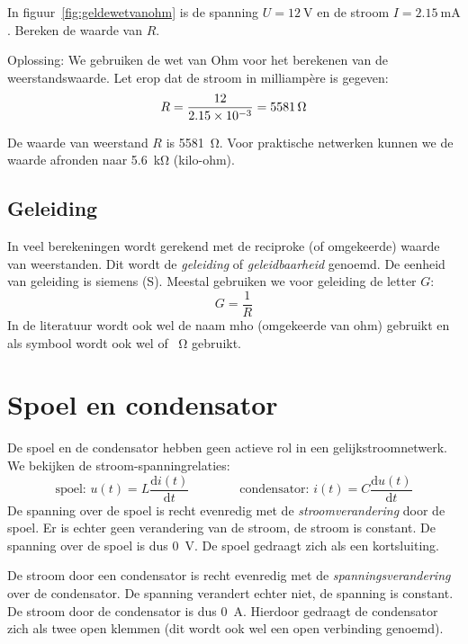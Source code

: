\begin{example}
In figuur~\ref{fig:geldewetvanohm} is de spanning $U=\SI{12}{\volt}$ en de stroom $I=\SI{2.15}{\milli\ampere}$.
Bereken de waarde van $R$.

Oplossing: We gebruiken de wet van Ohm voor het berekenen van de weerstandswaarde. Let erop dat de stroom in milliampère is gegeven:
\begin{equation}
R = \dfrac{12}{\num{2.15d-3}} = \SI{5581}{\ohm} 
\end{equation}

De waarde van weerstand $R$ is \SI{5581}{\ohm}. Voor praktische netwerken kunnen we de waarde afronden
naar \SI{5.6}{\kilo\ohm} (kilo-ohm).
\end{example}

\subsection{Geleiding}
In veel berekeningen wordt gerekend met de reciproke (of omgekeerde) waarde van weerstanden. Dit wordt
de \textsl{geleiding} of \textsl{geleidbaarheid} genoemd. De eenheid van geleiding is siemens (\si{\siemens}).
Meestal gebruiken we voor geleiding de letter $G$:
\begin{equation}
\label{equ:geleiding}
G = \dfrac{1}{R}
\end{equation}
In de literatuur wordt ook wel de naam mho (omgekeerde van ohm) gebruikt en als symbool wordt ook wel \si{\mho} of \si{\per\ohm} gebruikt.


\section{Spoel en condensator}
De spoel en de condensator hebben geen actieve rol in een gelijkstroomnetwerk. We bekijken de stroom-spanningrelaties:
%
\begin{equation}
\text{spoel: } u(t) = L\dfrac{\mathrm{d}i(t)}{\mathrm{d}t} \qquad\qquad \text{condensator: } i(t) = C\dfrac{\mathrm{d}u(t)}{\mathrm{d}t}
\end{equation}
%
De spanning over de spoel is recht evenredig met de \textsl{stroomverandering} door de spoel. Er is echter geen verandering van de stroom, de stroom is constant. De spanning over de spoel is dus \SI{0}{\volt}. De spoel gedraagt zich als een kortsluiting.

De stroom door een condensator is recht evenredig met de \textsl{spanningsverandering} over de condensator. De spanning verandert echter niet, de spanning is constant. De stroom door de condensator is dus \SI{0}{\ampere}. Hierdoor gedraagt de condensator zich als twee open klemmen (dit wordt ook wel een open verbinding genoemd).


